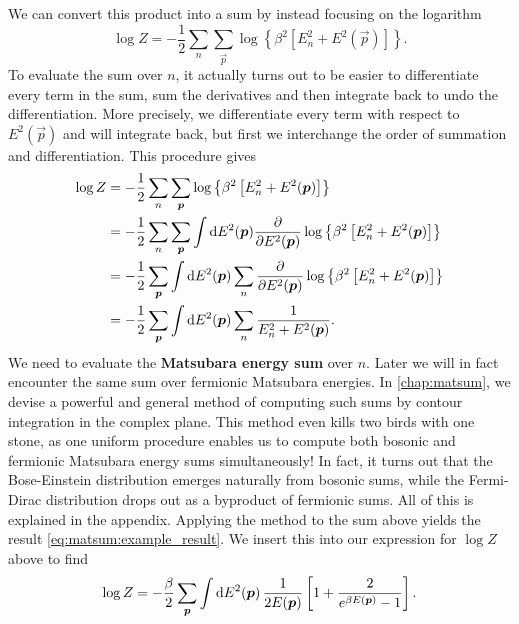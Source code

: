 \fi
We can convert this product into a sum by instead focusing on the logarithm
\begin{equation}
	\log Z = -\frac12 \sum_n \sum_\vec{p} 
	         \log \left\{ \beta^2 \left[ E_n^2 + E^2(\vec{p}) \right] \right\} .
\label{eq:tft:boson_log_sum}
\end{equation}
To evaluate the sum over $n$, it actually turns out to be easier to differentiate every term in the sum, sum the derivatives and then integrate back to undo the differentiation.
More precisely, we differentiate every term with respect to $E^2(\vec{p})$ and will integrate back, but first we interchange the order of summation and differentiation.
This procedure gives
\begin{equation}
\begin{split}
	\log Z &= -\frac12 \sum_n \sum_{\bm{p}} \log \left\{ \beta^2 \left[ E_n^2 + E^2({\bm{p}}) \right] \right\} \\
	       &= -\frac12 \sum_n \sum_{\bm{p}} \int \mathop{}\!\mathrm{d} E^2({\bm{p}}) \pdv*{\log \left\{ \beta^2 \left[ E_n^2 + E^2({\bm{p}}) \right] \right\}}{E^2({\bm{p}})} \\
	       &= -\frac12 \sum_{\bm{p}} \int \mathop{}\!\mathrm{d} E^2({\bm{p}}) \sum_n \pdv*{\log \left\{ \beta^2 \left[ E_n^2 + E^2({\bm{p}}) \right] \right\}}{E^2({\bm{p}})} \\
	       &= -\frac12 \sum_{\bm{p}} \int \mathop{}\!\mathrm{d} E^2({\bm{p}}) \sum_n \frac{1}{E_n^2 + E^2({\bm{p}})} . \\
\end{split}
\label{eq:tft:matsubara_sum_bosons}
\end{equation}
We need to evaluate the \textbf{Matsubara energy sum} over $n$. 
Later we will in fact encounter the same sum over fermionic Matsubara energies.
In \cref{chap:matsum}, we devise a powerful and general method of computing such sums by contour integration in the complex plane.
This method even kills two birds with one stone, as one uniform procedure enables us to compute both bosonic and fermionic Matsubara energy sums simultaneously!
In fact, it turns out that the Bose-Einstein distribution emerges naturally from bosonic sums, while the Fermi-Dirac distribution drops out as a byproduct of fermionic sums.
All of this is explained in the appendix.
Applying the method to the sum above yields the result \eqref{eq:matsum:example_result}.
We insert this into our expression for $\log Z$ above to find
\begin{equation}
	\log Z = -\frac{\beta}{2} \sum_{\bm{p}} \int \mathop{}\!\mathrm{d} E^2({\bm{p}}) \, \frac{1}{2 E({\bm{p}})} \left[ 1 + \frac{2}{e^{\beta E({\bm{p}})} - 1} \right] .
\end{equation}
